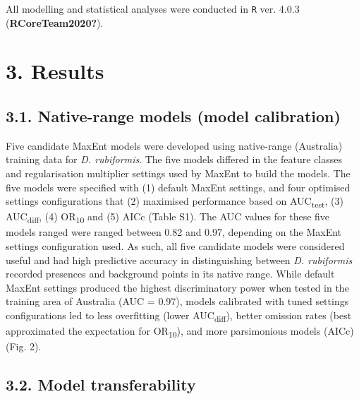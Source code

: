 \documentclass[12pt,]{article}
\begin{document}
All modelling and statistical analyses were conducted in \texttt{R} ver.
4.0.3 (\textbf{RCoreTeam2020?}).

\hypertarget{results}{%
\section{3. Results}\label{results}}

\hypertarget{native-range-models-model-calibration}{%
\subsection{3.1. Native-range models (model
calibration)}\label{native-range-models-model-calibration}}

Five candidate MaxEnt models were developed using native-range
(Australia) training data for \emph{D. rubiformis}. The five models
differed in the feature classes and regularisation multiplier settings
used by MaxEnt to build the models. The five models were specified with
(1) default MaxEnt settings, and four optimised settings configurations
that (2) maximised performance based on AUC\textsubscript{test}, (3)
AUC\textsubscript{diff}, (4) OR\textsubscript{10} and (5) AICc (Table
S1). The AUC values for these five models ranged were ranged between
0.82 and 0.97, depending on the MaxEnt settings configuration used. As
such, all five candidate models were considered useful and had high
predictive accuracy in distinguishing between \emph{D. rubiformis}
recorded presences and background points in its native range. While
default MaxEnt settings produced the highest discriminatory power when
tested in the training area of Australia (AUC = 0.97), models calibrated
with tuned settings configurations led to less overfitting (lower
AUC\textsubscript{diff}), better omission rates (best approximated the
expectation for OR\textsubscript{10}), and more parsimonious models
(AICc) (Fig. 2).

\hypertarget{model-transferability}{%
\subsection{3.2. Model transferability}\label{model-transferability}}
\end{document}
